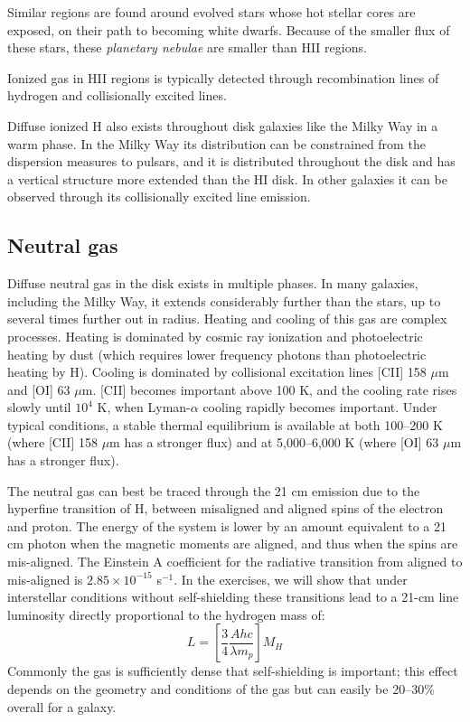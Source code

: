 Similar regions are found around evolved stars whose hot stellar cores
are exposed, on their path to becoming white dwarfs. Because of the
smaller flux of these stars, these {\it planetary nebulae} are smaller
than HII regions.

Ionized gas in HII regions is typically detected through recombination
lines of hydrogen and collisionally excited lines.

Diffuse ionized H also exists throughout disk galaxies like the Milky
Way in a warm phase. In the Milky Way its distribution can be
constrained from the dispersion measures to pulsars, and it is
distributed throughout the disk and has a vertical structure more
extended than the HI disk. In other galaxies it can be observed
through its collisionally excited line emission.

\subsection{Neutral gas}

Diffuse neutral gas in the disk exists in multiple phases. In many
galaxies, including the Milky Way, it extends considerably further
than the stars, up to several times further out in radius.  Heating
and cooling of this gas are complex processes. Heating is dominated by
cosmic ray ionization and photoelectric heating by dust (which
requires lower frequency photons than photoelectric heating by
H). Cooling is dominated by collisional excitation lines [CII] 158
$\mu$m and [OI] 63 $\mu$m. [CII] becomes important above 100 K, and
the cooling rate rises slowly until $10^4$ K, when Lyman-$\alpha$
cooling rapidly becomes important. Under typical conditions, a stable
thermal equilibrium is available at both 100--200 K (where [CII] 158
$\mu$m has a stronger flux) and at 5,000--6,000 K (where [OI] 63
$\mu$m has a stronger flux).

The neutral gas can best be traced through the 21 cm emission due to
the hyperfine transition of H, between misaligned and aligned spins of
the electron and proton. The energy of the system is lower by an
amount equivalent to a 21 cm photon when the magnetic moments are
aligned, and thus when the spins are mis-aligned. The Einstein A
coefficient for the radiative transition from aligned to mis-aligned
is $2.85\times 10^{-15}$ s$^{-1}$. In the exercises, we will show that
under interstellar conditions without self-shielding these transitions
lead to a 21-cm line luminosity directly proportional to the hydrogen
mass of:
\begin{equation}
\label{eq:hi}
L = \left[ \frac{3}{4} \frac{A hc} {\lambda m_p} \right] M_H
\end{equation}
Commonly the gas is sufficiently dense that self-shielding is
important; this effect depends on the geometry and conditions of the
gas but can easily be 20--30\% overall for a galaxy.


